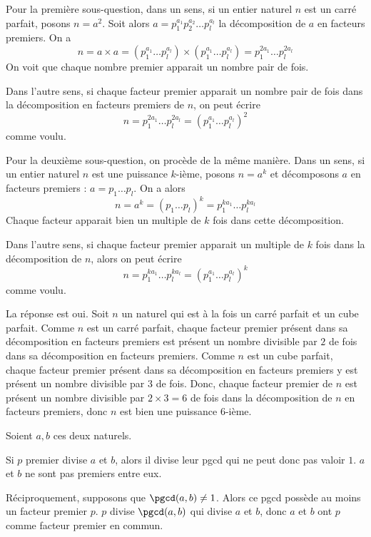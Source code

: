 \begin{sol}
Pour la première sous-question, dans un sens, si un entier naturel $n$ est un carré parfait, posons $n = a^2$. Soit alors $a = p_1^{a_1} p_2^{a_2} \dots p_l^{a_l}$ la décomposition de $a$ en facteurs premiers. On a
$$n = a \times a = \left(p_1^{a_1} \dots p_l^{a_l}\right) \times \left(p_1^{a_1} \dots p_l^{a_l}\right) = p_1^{2a_1} \dots p_l^{2a_l}$$
On voit que chaque nombre premier apparait un nombre pair de fois.

Dans l'autre sens, si chaque facteur premier apparait un nombre pair de fois dans la décomposition en facteurs premiers de $n$, on peut écrire
$$n = p_1^{2a_1} \dots p_l^{2a_l} = \left(p_1^{a_1} \dots p_l^{a_l}\right)^2$$
comme voulu.

Pour la deuxième sous-question, on procède de la même manière.
Dans un sens, si un entier naturel $n$ est une puissance $k$-ième, posons $n = a^k$ et décomposons $a$ en facteurs premiers : $a = p_1 \dots p_l$. On a alors
$$n = a^k = \left(p_1 \dots p_l\right)^k = p_1^{ka_1} \dots p_l^{ka_l}$$
Chaque facteur apparait bien un multiple de $k$ fois dans cette décomposition.

Dans l'autre sens, si chaque facteur premier apparait un multiple de $k$ fois dans la décomposition de $n$, alors on peut écrire
$$n = p_1^{ka_1} \dots p_l^{ka_l} = \left(p_1^{a_1} \dots p_l^{a_l}\right)^k$$
comme voulu.
\end{sol}


\begin{sol}
La réponse est oui. Soit $n$ un naturel qui est à la fois un carré parfait et un cube parfait. Comme $n$ est un carré parfait, chaque facteur premier présent dans sa décomposition en facteurs premiers est présent un nombre divisible par $2$ de fois dans sa décomposition en facteurs premiers. Comme $n$ est un cube parfait, chaque facteur premier présent dans sa décomposition en facteurs premiers y est présent un nombre divisible par $3$ de fois. Donc, chaque facteur premier de $n$ est présent un nombre divisible par $2 \times 3 = 6$ de fois dans la décomposition de $n$ en facteurs premiers, donc $n$ est bien une puissance $6$-ième.
\end{sol}


\begin{sol}
Soient $a, b$ ces deux naturels.

Si $p$ premier divise $a$ et $b$, alors il divise leur pgcd qui ne peut donc pas valoir $1$. $a$ et $b$ ne sont pas premiers entre eux.

Réciproquement, supposons que $\pgcd(a, b) \ne 1$. Alors ce pgcd possède au moins un facteur premier $p$. $p$ divise $\pgcd(a, b)$ qui divise $a$ et $b$, donc $a$ et $b$ ont $p$ comme facteur premier en commun.
\end{sol}


